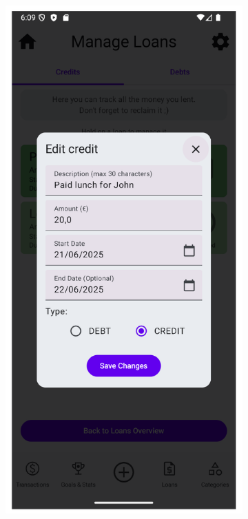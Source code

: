 \documentclass[a4paper,12pt]{article}
\begin{document}
\begin{figure}[H]
    \centering
    \ContinuedFloat
    \begin{subfigure}[b]{0.23\textwidth}
        \includegraphics[width=\textwidth]{manage_loans_edit_dialog.png}

\end{subfigure}
\end{figure}
\end{document}
